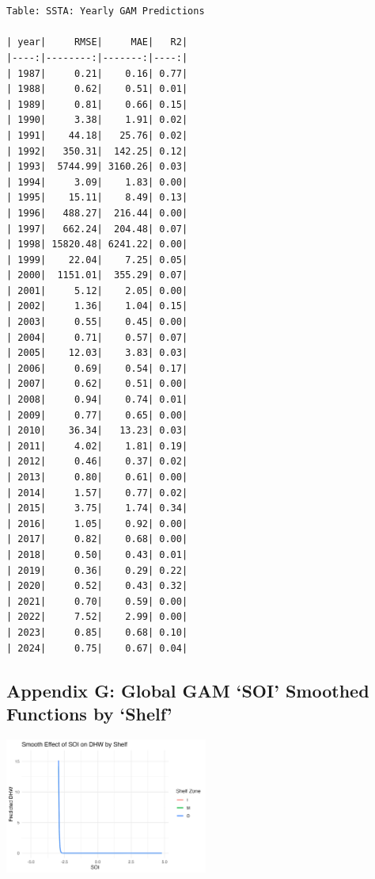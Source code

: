 \documentclass[letterpaper,9pt,twocolumn,twoside,]{pinp}
\begin{document}
\begin{ShadedResult}
\begin{verbatim}


Table: SSTA: Yearly GAM Predictions

| year|     RMSE|     MAE|   R2|
|----:|--------:|-------:|----:|
| 1987|     0.21|    0.16| 0.77|
| 1988|     0.62|    0.51| 0.01|
| 1989|     0.81|    0.66| 0.15|
| 1990|     3.38|    1.91| 0.02|
| 1991|    44.18|   25.76| 0.02|
| 1992|   350.31|  142.25| 0.12|
| 1993|  5744.99| 3160.26| 0.03|
| 1994|     3.09|    1.83| 0.00|
| 1995|    15.11|    8.49| 0.13|
| 1996|   488.27|  216.44| 0.00|
| 1997|   662.24|  204.48| 0.07|
| 1998| 15820.48| 6241.22| 0.00|
| 1999|    22.04|    7.25| 0.05|
| 2000|  1151.01|  355.29| 0.07|
| 2001|     5.12|    2.05| 0.00|
| 2002|     1.36|    1.04| 0.15|
| 2003|     0.55|    0.45| 0.00|
| 2004|     0.71|    0.57| 0.07|
| 2005|    12.03|    3.83| 0.03|
| 2006|     0.69|    0.54| 0.17|
| 2007|     0.62|    0.51| 0.00|
| 2008|     0.94|    0.74| 0.01|
| 2009|     0.77|    0.65| 0.00|
| 2010|    36.34|   13.23| 0.03|
| 2011|     4.02|    1.81| 0.19|
| 2012|     0.46|    0.37| 0.02|
| 2013|     0.80|    0.61| 0.00|
| 2014|     1.57|    0.77| 0.02|
| 2015|     3.75|    1.74| 0.34|
| 2016|     1.05|    0.92| 0.00|
| 2017|     0.82|    0.68| 0.00|
| 2018|     0.50|    0.43| 0.01|
| 2019|     0.36|    0.29| 0.22|
| 2020|     0.52|    0.43| 0.32|
| 2021|     0.70|    0.59| 0.00|
| 2022|     7.52|    2.99| 0.00|
| 2023|     0.85|    0.68| 0.10|
| 2024|     0.75|    0.67| 0.04|

\end{verbatim}
\end{ShadedResult}

\subsection{Appendix G: Global GAM `SOI' Smoothed Functions by
`Shelf'}\label{appendix-g-global-gam-soi-smoothed-functions-by-shelf}

\begin{center}
\includegraphics[width=0.5\textwidth]{report_images/soi_shelf_dhw.png}
\end{center}
\end{document}
